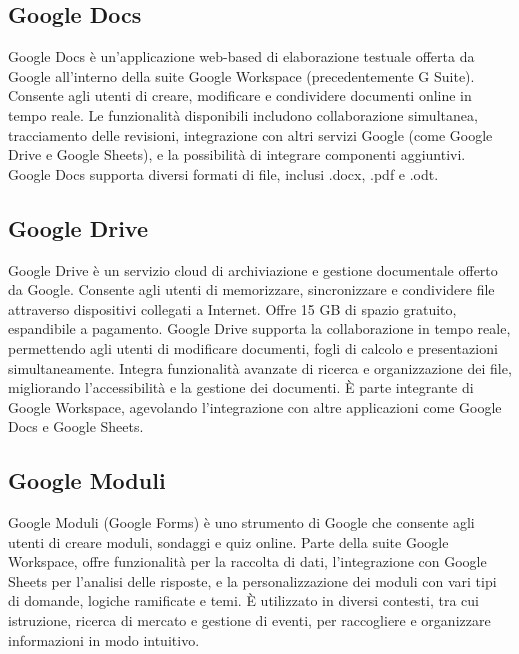 \vspace{2em}
\subsection*{Google Docs}
\par Google Docs è un'applicazione web-based di elaborazione testuale offerta da Google all'interno della suite Google Workspace (precedentemente G Suite). Consente agli utenti di creare, modificare e condividere documenti online in tempo reale. Le funzionalità disponibili includono collaborazione simultanea, tracciamento delle revisioni, integrazione con altri servizi Google (come Google Drive e Google Sheets), e la possibilità di integrare componenti aggiuntivi. Google Docs supporta diversi formati di file, inclusi .docx, .pdf e .odt.

\vspace{2em}
\subsection*{Google Drive}
\par Google Drive è un servizio cloud di archiviazione e gestione documentale offerto da Google. Consente agli utenti di memorizzare, sincronizzare e condividere file attraverso dispositivi collegati a Internet. Offre 15 GB di spazio gratuito, espandibile a pagamento. Google Drive supporta la collaborazione in tempo reale, permettendo agli utenti di modificare documenti, fogli di calcolo e presentazioni simultaneamente. Integra funzionalità avanzate di ricerca e organizzazione dei file, migliorando l'accessibilità e la gestione dei documenti. È parte integrante di Google Workspace, agevolando l'integrazione con altre applicazioni come Google Docs e Google Sheets.

\vspace{2em}
\subsection*{Google Moduli}
\par Google Moduli (Google Forms) è uno strumento di Google che consente agli utenti di creare moduli, sondaggi e quiz online. Parte della suite Google Workspace, offre funzionalità per la raccolta di dati, l'integrazione con Google Sheets per l'analisi delle risposte, e la personalizzazione dei moduli con vari tipi di domande, logiche ramificate e temi. È utilizzato in diversi contesti, tra cui istruzione, ricerca di mercato e gestione di eventi, per raccogliere e organizzare informazioni in modo intuitivo.


